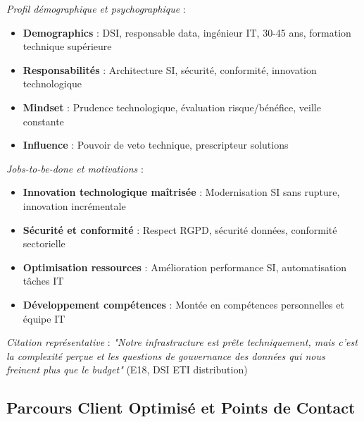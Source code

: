 \emph{Profil démographique et psychographique} :
\begin{itemize}
    \item \textbf{Demographics} : DSI, responsable data, ingénieur IT, 30-45 ans, formation technique supérieure
    \item \textbf{Responsabilités} : Architecture SI, sécurité, conformité, innovation technologique
    \item \textbf{Mindset} : Prudence technologique, évaluation risque/bénéfice, veille constante
    \item \textbf{Influence} : Pouvoir de veto technique, prescripteur solutions
\end{itemize}
\medskip
\emph{Jobs-to-be-done et motivations} :
\begin{itemize}
    \item \textbf{Innovation technologique maîtrisée} : Modernisation SI sans rupture, innovation incrémentale
    \item \textbf{Sécurité et conformité} : Respect RGPD, sécurité données, conformité sectorielle
    \item \textbf{Optimisation ressources} : Amélioration performance SI, automatisation tâches IT
    \item \textbf{Développement compétences} : Montée en compétences personnelles et équipe IT
\end{itemize}
\medskip
\emph{Citation représentative} : \emph{"Notre infrastructure est prête techniquement, mais c'est la complexité perçue et les questions de gouvernance des données qui nous freinent plus que le budget"} (E18, DSI ETI distribution)

\subsection{Parcours Client Optimisé et Points de Contact}

